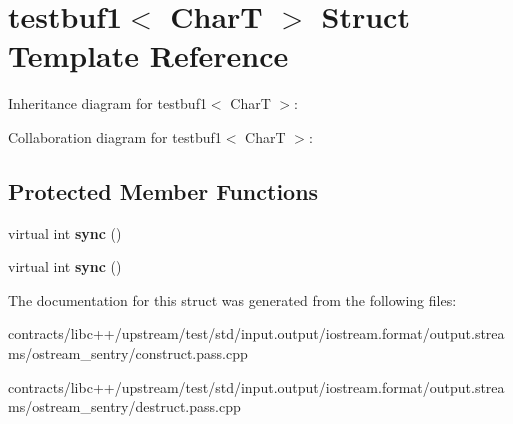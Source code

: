 \hypertarget{structtestbuf1}{}\section{testbuf1$<$ CharT $>$ Struct Template Reference}
\label{structtestbuf1}


Inheritance diagram for testbuf1$<$ CharT $>$\+:


Collaboration diagram for testbuf1$<$ CharT $>$\+:
\subsection*{Protected Member Functions}
\begin{DoxyCompactItemize}
\item 
\mbox{\label{structtestbuf1_a61c9289b9977ed85645e59d868ba157e}} 
virtual int {\bfseries sync} ()
\item 
\mbox{\label{structtestbuf1_a61c9289b9977ed85645e59d868ba157e}} 
virtual int {\bfseries sync} ()
\end{DoxyCompactItemize}


The documentation for this struct was generated from the following files\+:\begin{DoxyCompactItemize}
\item 
contracts/libc++/upstream/test/std/input.\+output/iostream.\+format/output.\+streams/ostream\+\_\+sentry/construct.\+pass.\+cpp\item 
contracts/libc++/upstream/test/std/input.\+output/iostream.\+format/output.\+streams/ostream\+\_\+sentry/destruct.\+pass.\+cpp\end{DoxyCompactItemize}
